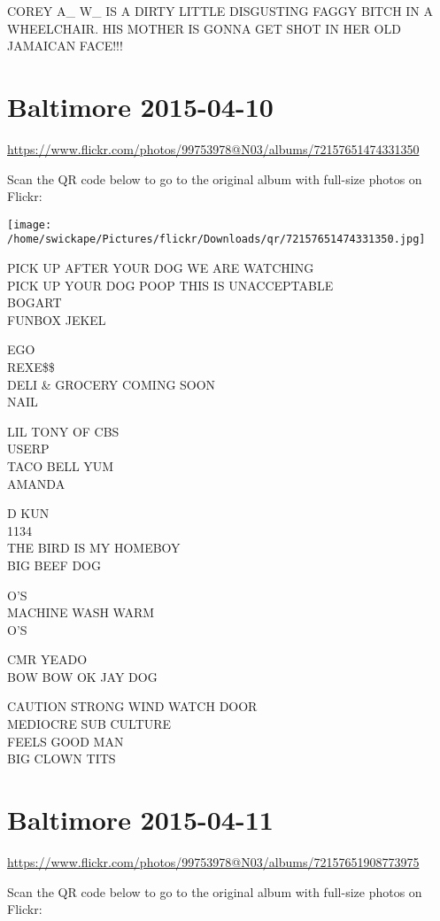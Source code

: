 \documentclass[10pt,letterpaper]{article}
\begin{document}
COREY A\_ W\_ IS A DIRTY LITTLE DISGUSTING FAGGY BITCH IN A WHEELCHAIR.  HIS MOTHER IS GONNA GET SHOT IN HER OLD JAMAICAN FACE!!!


\section*{Baltimore 2015-04-10}

\url{https://www.flickr.com/photos/99753978@N03/albums/72157651474331350}

Scan the QR code below to go to the original album with full-size photos on Flickr:

\texttt{[image: /home/swickape/Pictures/flickr/Downloads/qr/72157651474331350.jpg]}


PICK UP AFTER YOUR DOG WE ARE WATCHING\\
PICK UP YOUR DOG POOP THIS IS UNACCEPTABLE\\
BOGART\\
FUNBOX JEKEL

EGO\\
REXE\$\$\\
DELI \& GROCERY COMING SOON\\
NAIL

LIL TONY OF CBS\\
USERP\\
TACO BELL YUM\\
AMANDA

D KUN\\
1134\\
THE BIRD IS MY HOMEBOY\\
BIG BEEF DOG

O'S\\
MACHINE WASH WARM\\
O'S

CMR YEADO\\
BOW BOW OK JAY DOG

CAUTION STRONG WIND WATCH DOOR\\
MEDIOCRE SUB CULTURE\\
FEELS GOOD MAN\\
BIG CLOWN TITS


\section*{Baltimore 2015-04-11}

\url{https://www.flickr.com/photos/99753978@N03/albums/72157651908773975}

Scan the QR code below to go to the original album with full-size photos on Flickr:
\end{document}
